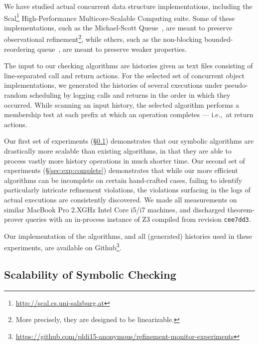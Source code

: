 We have studied actual concurrent data structure implementations, including the
Scal\footnote{\url{http://scal.cs.uni-salzburg.at}} High-Performance
Multicore-Scalable Computing suite. Some of these implementations, such as the
Michael-Scott Queue~\cite{conf/podc/MichaelS96}, are meant to preserve
observational refinement\footnote{More precisely, they are designed to be
linearizable.}, while others, such as the non-blocking bounded-reordering
queue~\cite{conf/pact/KirschLP13}, are meant to preserve weaker properties.

The input to our checking algorithms are histories given as text files
consisting of line-separated call and return actions. For the selected set of
concurrent object implementations, we generated the histories of several
executions under pseudo-random scheduling by logging calls and returns in the
order in which they occurred. While scanning an input history, the selected
algorithm performs a membership test at each prefix at which an operation
completes --- i.e.,~at return actions.

Our first set of experiments (\S\ref{sec:exp:scalable}) demonstrates that our
symbolic algorithms are drastically more scalable than existing algorithms, in
that they are able to process vastly more history operations in much shorter
time. Our second set of experiments (\S\ref{sec:exp:complete}) demonstrates
that while our more efficient algorithms can be incomplete on certain
hand-crafted cases, failing to identify particularly intricate refinement
violations, the violations surfacing in the logs of actual executions are
consistently discovered. We made all measurements on similar MacBook Pro 2.XGHz
Intel Core i5/i7 machines, and discharged theorem-prover queries with an
in-process instance of Z3 compiled from revision {\tt cee7dd3}.


Our implementation of the algorithms, and all (generated) histories used in
these experiments, are available on
Github\footnote{\url{https://github.com/pldi15-anonymous/refinement-monitor-experiments}}.

\subsection{Scalability of Symbolic Checking}
\label{sec:exp:scalable}

